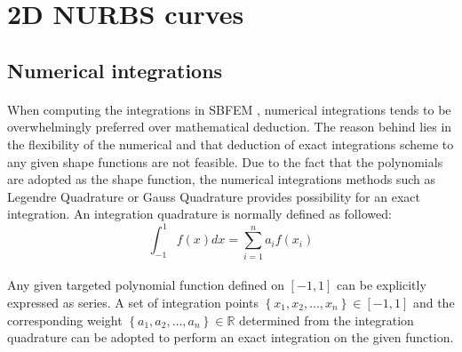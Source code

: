 \section{2D NURBS curves}



\subsection{Numerical integrations}
\label{subsection:numerical_integration}
\paragraph{}
When computing the integrations in SBFEM %
    , numerical integrations tends to be overwhelmingly preferred over mathematical deduction. 
The reason behind lies in the flexibility of the numerical and that deduction of exact integrations scheme 
    to any given shape functions are not feasible. 
Due to the fact that the polynomials are adopted as the shape function, the numerical integrations methods 
    such as Legendre Quadrature or Gauss Quadrature provides possibility for an exact integration. 
An integration quadrature is normally defined as followed:
    \begin{equation}
        \int_{-1}^{1}
        f(x)dx 
        = \sum_{i=1}^n
        a_i f(x_i)
    \label{eq:numerical_integration}
    \end{equation}

\paragraph{}
Any given targeted polynomial function defined on $[-1,1]$ can be explicitly expressed as series.
A set of integration points $\left\{ x_1, x_2, \dots, x_n \right\} \in \left[-1,1\right]$ and the corresponding weight $\left\{ a_1, a_2, 
    \dots, a_n \right\} \in \mathbb{R}$ determined from the integration quadrature can be adopted to perform an exact integration
    on the given function.
